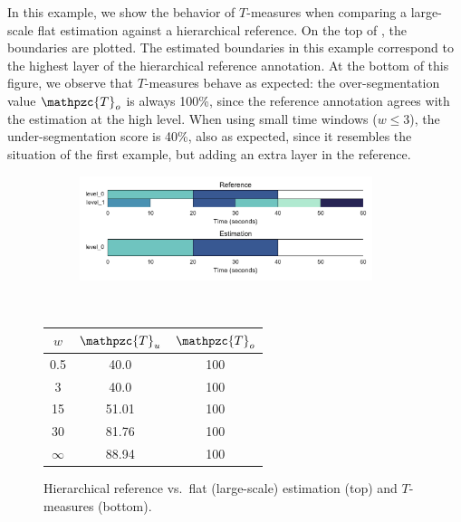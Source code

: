 \documentclass{article}
\def\shag{\ensuremath{\mathpzc{T}}}
\begin{document}
In this example, we show the behavior of $T$-measures when comparing a large-scale flat estimation against a hierarchical reference.
On the top of , the boundaries are plotted.
The estimated boundaries in this example correspond to the highest layer of the hierarchical reference annotation.
At the bottom of this figure, we observe that $T$-measures behave as expected: the over-segmentation value $\shag_o$ is always 100\%, since the reference annotation agrees with the estimation at the high level.
When using small time windows ($w \leq 3$), the under-segmentation score is 40\%, also as expected, since it resembles the situation of the first example, but adding an extra layer in the reference.


\begin{figure}
  \centering
  \begin{subfigure}{0.5\textwidth}
    \centering
    \includegraphics[width=0.94\textwidth]{figs/hier-flatlarge.pdf}
  \end{subfigure}%
  \\
  \begin{minipage}{0.5\textwidth}
    \centering
    \vspace{10pt}
    \begin{tabular}{|c|c|c|}
      \hline
      $w$       & $\shag_u$    & $\shag_o$      \\
      \hline
      0.5       & 40.0      & 100      \\     
      3         & 40.0      & 100      \\
      15        & 51.01     & 100    \\
      30        & 81.76     & 100    \\
      $\infty$  & 88.94     & 100    \\
      \hline
    \end{tabular}
  \end{minipage}
  \caption{Hierarchical reference vs.\ flat (large-scale) estimation (top) and $T$-measures (bottom).}
  \label{fig:hier-flatlarge}
\end{figure}
\end{document}
